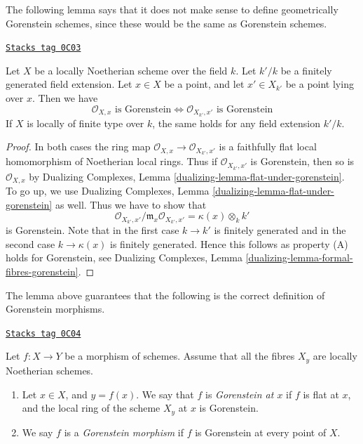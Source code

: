 \medskip\noindent
The following lemma says that it does not make sense to define
geometrically Gorenstein schemes, since these would be the
same as Gorenstein schemes.

\begin{lemma}
\label{duality-lemma-gorenstein-base-change}
\href{https://stacks.math.columbia.edu/tag/0C03}{\texttt{Stacks tag 0C03}}

Let $X$ be a locally Noetherian scheme over the field $k$.
Let $k'/k$ be a finitely generated field extension.
Let $x \in X$ be a point, and let $x' \in X_{k'}$ be a point lying
over $x$. Then we have
$$
\mathcal{O}_{X, x}\text{ is Gorenstein}
\Leftrightarrow
\mathcal{O}_{X_{k'}, x'}\text{ is Gorenstein}
$$
If $X$ is locally of finite type over $k$, the same holds for any
field extension $k'/k$.
\end{lemma}

\begin{proof}
In both cases the ring map $\mathcal{O}_{X, x} \to \mathcal{O}_{X_{k'}, x'}$
is a faithfully flat local homomorphism of Noetherian local rings.
Thus if $\mathcal{O}_{X_{k'}, x'}$ is Gorenstein, then so is
$\mathcal{O}_{X, x}$ by
Dualizing Complexes, Lemma \ref{dualizing-lemma-flat-under-gorenstein}.
To go up, we use
Dualizing Complexes, Lemma \ref{dualizing-lemma-flat-under-gorenstein} as well.
Thus we have to show that
$$
\mathcal{O}_{X_{k'}, x'}/\mathfrak m_x \mathcal{O}_{X_{k'}, x'} =
\kappa(x) \otimes_k k'
$$
is Gorenstein. Note that in the first case $k \to k'$ is finitely
generated and in the second case $k \to \kappa(x)$ is finitely
generated. Hence this follows as property (A) holds for
Gorenstein, see Dualizing Complexes, Lemma
\ref{dualizing-lemma-formal-fibres-gorenstein}.
\end{proof}

The lemma above guarantees that the following is the correct definition
of Gorenstein morphisms.

\begin{definition}
\label{duality-definition-gorenstein-morphism}
\href{https://stacks.math.columbia.edu/tag/0C04}{\texttt{Stacks tag 0C04}}

Let $f : X \to Y$ be a morphism of schemes.
Assume that all the fibres $X_y$ are locally Noetherian schemes.
\begin{enumerate}
\item Let $x \in X$, and $y = f(x)$. We say that $f$ is
{\it Gorenstein at $x$} if $f$ is flat at $x$, and the
local ring of the scheme $X_y$ at $x$ is Gorenstein.
\item We say $f$ is a {\it Gorenstein morphism} if $f$ is
Gorenstein at every point of $X$.
\end{enumerate}
\end{definition}

